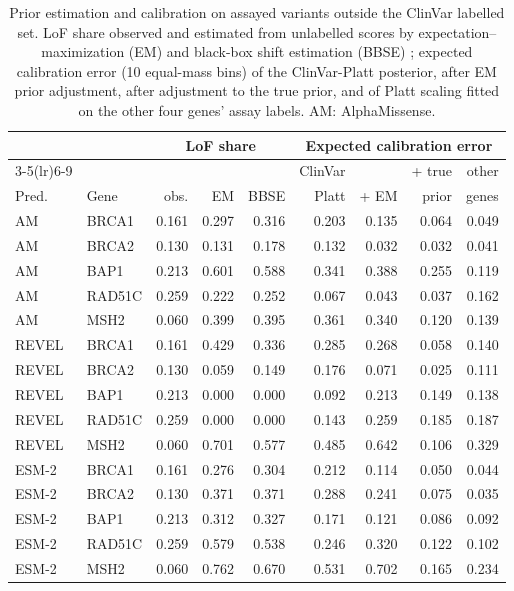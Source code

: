 \begin{table}[ht]
\centering
\caption{Prior estimation and calibration on assayed variants outside the ClinVar labelled set. LoF share observed and estimated from
unlabelled scores by expectation--maximization (EM) \cite{Saerens2002} and black-box shift estimation (BBSE) \cite{Lipton2018}; expected calibration error (10 equal-mass
bins) of the ClinVar-Platt posterior, after EM prior adjustment, after adjustment to the true prior, and of Platt
scaling fitted on the other four genes' assay labels. AM: AlphaMissense.}\label{tab:app_prior}
\setlength{\tabcolsep}{4.5pt}
\begin{tabular}{llrrrrrrr}
\toprule
 & & \multicolumn{3}{c}{LoF share} & \multicolumn{4}{c}{Expected calibration error}\\
\cmidrule(lr){3-5}\cmidrule(lr){6-9}
 & & & & & ClinVar & & + true & other\\
Pred. & Gene & obs. & EM & BBSE & Platt & + EM & prior & genes\\
\midrule
AM & BRCA1 & 0.161 & 0.297 & 0.316 & 0.203 & 0.135 & 0.064 & 0.049 \\
AM & BRCA2 & 0.130 & 0.131 & 0.178 & 0.132 & 0.032 & 0.032 & 0.041 \\
AM & BAP1 & 0.213 & 0.601 & 0.588 & 0.341 & 0.388 & 0.255 & 0.119 \\
AM & RAD51C & 0.259 & 0.222 & 0.252 & 0.067 & 0.043 & 0.037 & 0.162 \\
AM & MSH2 & 0.060 & 0.399 & 0.395 & 0.361 & 0.340 & 0.120 & 0.139 \\
REVEL & BRCA1 & 0.161 & 0.429 & 0.336 & 0.285 & 0.268 & 0.058 & 0.140 \\
REVEL & BRCA2 & 0.130 & 0.059 & 0.149 & 0.176 & 0.071 & 0.025 & 0.111 \\
REVEL & BAP1 & 0.213 & 0.000 & 0.000 & 0.092 & 0.213 & 0.149 & 0.138 \\
REVEL & RAD51C & 0.259 & 0.000 & 0.000 & 0.143 & 0.259 & 0.185 & 0.187 \\
REVEL & MSH2 & 0.060 & 0.701 & 0.577 & 0.485 & 0.642 & 0.106 & 0.329 \\
ESM-2 & BRCA1 & 0.161 & 0.276 & 0.304 & 0.212 & 0.114 & 0.050 & 0.044 \\
ESM-2 & BRCA2 & 0.130 & 0.371 & 0.371 & 0.288 & 0.241 & 0.075 & 0.035 \\
ESM-2 & BAP1 & 0.213 & 0.312 & 0.327 & 0.171 & 0.121 & 0.086 & 0.092 \\
ESM-2 & RAD51C & 0.259 & 0.579 & 0.538 & 0.246 & 0.320 & 0.122 & 0.102 \\
ESM-2 & MSH2 & 0.060 & 0.762 & 0.670 & 0.531 & 0.702 & 0.165 & 0.234 \\
\bottomrule
\end{tabular}
\end{table}
